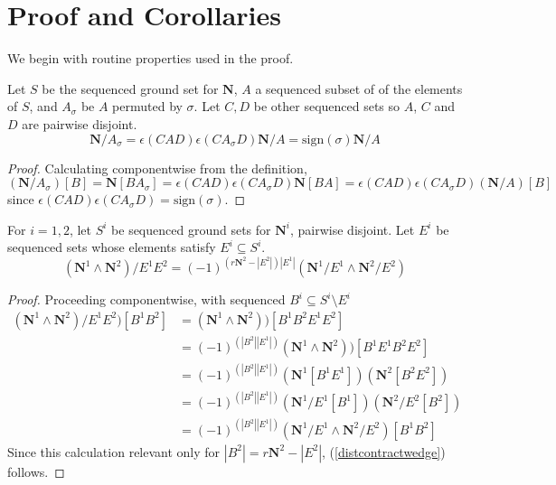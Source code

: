 \documentclass[Unicode]{cedram-alco}
\newcommand{\ext}[1]{\ensuremath{\mathbf{#1}}}
\begin{document}






\section{Proof and Corollaries}\label{proofs}

We begin with routine properties used in the proof.

    \begin{prop}
      Let $S$ be the sequenced ground set for $\ext{N}$, $A$ a sequenced subset of
      of the elements of $S$, and $A_\sigma$ be $A$ permuted by $\sigma$.  Let $C, D$ be other sequenced
      sets so $A$, $C$ and $D$ are pairwise disjoint.
      \begin{equation}\label{permuteContraction}
        \ext{N}/A_\sigma = \epsilon(CAD)\epsilon(CA_\sigma D)\ext{N}/A = \text{sign}(\sigma)\ext{N}/A
      \end{equation}
    \end{prop}
    \begin{proof}
      Calculating componentwise from the definition,
      \[
      (\ext{N}/A_\sigma)[B]=\ext{N}[BA_\sigma]=\epsilon(CAD)\epsilon(CA_\sigma D)\ext{N}[BA]=
      \epsilon(CAD)\epsilon(CA_\sigma D)(\ext{N}/A)[B]
      \]
      since $\epsilon(CAD)\epsilon(CA_\sigma D)=\text{sign}(\sigma)$.
    \end{proof}


    \begin{prop}
      For $i=1, 2$, let $S^{i}$ be sequenced ground sets for $\ext{N}^{i}$, pairwise disjoint.
      Let $E^i$ be sequenced sets whose elements satisfy $E^i\subseteq S^i$.
      \begin{equation}\label{distcontractwedge}
        (\ext{N}^1 \wedge \ext{N}^2)/E^1E^2 = (-1)^{(r\ext{N}^2-|E^2|) |E^1|} (\ext{N}^1/E^1 \wedge \ext{N}^2/E^2)
      \end{equation}
    \end{prop}
    \begin{proof}
      Proceeding componentwise, with sequenced $B^i\subseteq S^i\setminus E^i$
      \begin{equation*}
        \begin{split}
      (\ext{N}^1 \wedge \ext{N}^2)/E^1E^2)[B^1B^2]
      &=(\ext{N}^1 \wedge \ext{N}^2))[B^1B^2E^1E^2]
      \\
      &=(-1)^{(|B^2| |E^1|)} (\ext{N}^1 \wedge \ext{N}^2))[B^1E^1B^2E^2]
      \\
      &=(-1)^{(|B^2| |E^1|)} (\ext{N}^1[B^1E^1])( \ext{N}^2[B^2E^2])
      \\
      &=(-1)^{(|B^2| |E^1|)} (\ext{N}^1/E^1[B^1])( \ext{N}^2/E^2[B^2])
      \\
      &=(-1)^{(|B^2| |E^1|)} (\ext{N}^1/E^1 \wedge \ext{N}^2/E^2)[B^1B^2]
        \end{split}
      \end{equation*}
      Since this calculation relevant only for $|B^2|=r\ext{N}^2-|E^2|$, (\ref{distcontractwedge}) follows.
    \end{proof}
\end{document}
